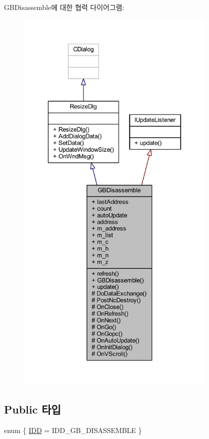 G\+B\+Disassemble에 대한 협력 다이어그램\+:\nopagebreak
\begin{figure}[H]
\begin{center}
\leavevmode
\includegraphics[height=550pt]{class_g_b_disassemble__coll__graph}
\end{center}
\end{figure}
\subsection*{Public 타입}
\begin{DoxyCompactItemize}
\item 
enum \{ \mbox{\hyperlink{class_g_b_disassemble_a7af15be4d057c5f04b6b51c5e8011416ab3ecbcf1d05db942d787bf38dbf7051c}{I\+DD}} = I\+D\+D\+\_\+\+G\+B\+\_\+\+D\+I\+S\+A\+S\+S\+E\+M\+B\+LE
 \}
\end{DoxyCompactItemize}
